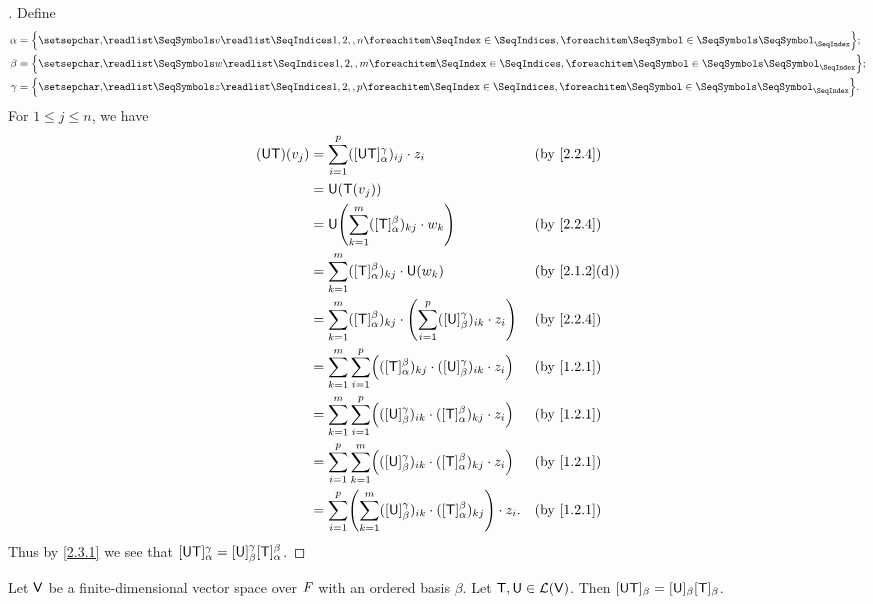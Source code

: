 \begin{proof}[]
  Define
  \begin{align*}
    \alpha & = \set{\seq{v}{1,2,,n}}; \\
    \beta  & = \set{\seq{w}{1,2,,m}}; \\
    \gamma & = \set{\seq{z}{1,2,,p}}.
  \end{align*}
  For \(1 \leq j \leq n\), we have
  \begin{align*}
    (\U \T)(v_j) & = \sum_{i = 1}^p ([\U \T]_{\alpha}^{\gamma})_{i j} \cdot z_i                                                      &  & \text{(by \cref{2.2.4})}    \\
                 & = \U(\T(v_j))                                                                                                                                      \\
                 & = \U\pa{\sum_{k = 1}^m ([\T]_{\alpha}^{\beta})_{k j} \cdot w_k}                                                   &  & \text{(by \cref{2.2.4})}    \\
                 & = \sum_{k = 1}^m ([\T]_{\alpha}^{\beta})_{k j} \cdot \U(w_k)                                                      &  & \text{(by \cref{2.1.2}(d))} \\
                 & = \sum_{k = 1}^m ([\T]_{\alpha}^{\beta})_{k j} \cdot \pa{\sum_{i = 1}^p ([\U]_{\beta}^{\gamma})_{i k} \cdot z_i}  &  & \text{(by \cref{2.2.4})}    \\
                 & = \sum_{k = 1}^m \sum_{i = 1}^p \pa{([\T]_{\alpha}^{\beta})_{k j}  \cdot ([\U]_{\beta}^{\gamma})_{i k} \cdot z_i} &  & \text{(by \cref{1.2.1})}    \\
                 & = \sum_{k = 1}^m \sum_{i = 1}^p \pa{([\U]_{\beta}^{\gamma})_{i k} \cdot ([\T]_{\alpha}^{\beta})_{k j} \cdot z_i}  &  & \text{(by \cref{1.2.1})}    \\
                 & = \sum_{i = 1}^p \sum_{k = 1}^m \pa{([\U]_{\beta}^{\gamma})_{i k} \cdot ([\T]_{\alpha}^{\beta})_{k j} \cdot z_i}  &  & \text{(by \cref{1.2.1})}    \\
                 & = \sum_{i = 1}^p \pa{\sum_{k = 1}^m ([\U]_{\beta}^{\gamma})_{i k} \cdot ([\T]_{\alpha}^{\beta})_{k j}} \cdot z_i. &  & \text{(by \cref{1.2.1})}
  \end{align*}
  Thus by \cref{2.3.1} we see that \([\mathsf{U} \mathsf{T}]_{\alpha}^{\gamma} = [\mathsf{U}]_{\beta}^{\gamma} [\mathsf{T}]_{\alpha}^{\beta}\).
\end{proof}

\begin{cor}\label{2.3.3}
  Let \(\mathsf{V}\) be a finite-dimensional vector space over \(\mathit{F}\) with an ordered basis \(\beta\).
  Let \(\mathsf{T}, \mathsf{U} \in \mathcal{L}(\mathsf{V})\).
  Then \([\mathsf{U} \mathsf{T}]_{\beta} = [\mathsf{U}]_{\beta} [\mathsf{T}]_{\beta}\).
\end{cor}

